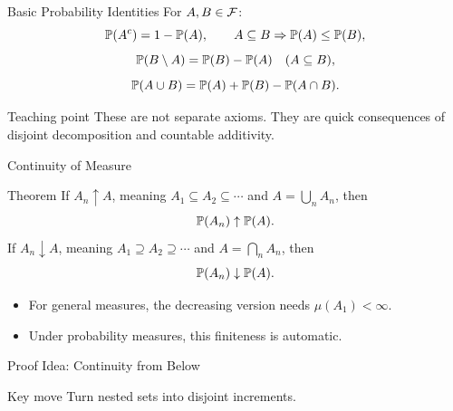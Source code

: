 \begin{frame}{Basic Probability Identities}
  For $A,B\in\mathcal{F}$:
  \[
    \mathbb{P}(A^c)=1-\mathbb{P}(A),\qquad
    A\subseteq B\Rightarrow \mathbb{P}(A)\le \mathbb{P}(B),
  \]
  \[
    \mathbb{P}(B\setminus A)=\mathbb{P}(B)-\mathbb{P}(A)\quad(A\subseteq B),
  \]
  \[
    \mathbb{P}(A\cup B)=\mathbb{P}(A)+\mathbb{P}(B)-\mathbb{P}(A\cap B).
  \]
  \begin{alertblock}{Teaching point}
    These are not separate axioms. They are quick consequences of disjoint decomposition and countable additivity.
  \end{alertblock}
\end{frame}

\begin{frame}{Continuity of Measure}
  \begin{block}{Theorem}
    If $A_n\uparrow A$, meaning $A_1\subseteq A_2\subseteq\cdots$ and $A=\bigcup_n A_n$, then
    \[
      \mathbb{P}(A_n)\uparrow \mathbb{P}(A).
    \]
    If $A_n\downarrow A$, meaning $A_1\supseteq A_2\supseteq\cdots$ and $A=\bigcap_n A_n$, then
    \[
      \mathbb{P}(A_n)\downarrow \mathbb{P}(A).
    \]
  \end{block}
  \begin{itemize}
    \item For general measures, the decreasing version needs $\mu(A_1)<\infty$.
    \item Under probability measures, this finiteness is automatic.
  \end{itemize}
\end{frame}

\begin{frame}[shrink=8]{Proof Idea: Continuity from Below}
  \begin{block}{Key move}
    Turn nested sets into disjoint increments.
  \end{block}
\end{frame}

